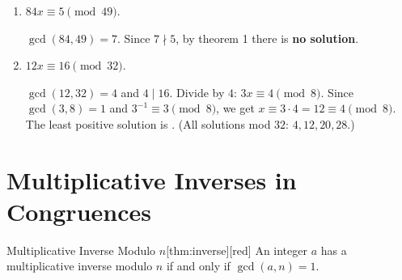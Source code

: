 \documentclass[11pt]{article}
\begin{document}
\begin{enumerate}
  \item $84x\equiv5\pmod{49}$.
  \begin{subanswer}
    $\gcd(84,49)=7$. Since $7\nmid5$, by theorem 1 there is \textbf{no solution}.
  \end{subanswer}
  \item $12x\equiv16\pmod{32}$.
  \begin{subanswer}
    $\gcd(12,32)=4$ and $4\mid16$. Divide by $4$: $3x\equiv4\pmod8$. Since $\gcd(3,8)=1$ and $3^{-1}\equiv3\pmod8$, we get $x\equiv3\cdot4=12\equiv4\pmod8$. The least positive solution is . (All solutions mod $32$: $4,12,20,28$.)
  \end{subanswer}
\end{enumerate}






\newpage

\section*{Multiplicative Inverses in Congruences}

\begin{define}{Multiplicative Inverse Modulo $n$}[thm:inverse][red]
  An integer $a$ has a multiplicative inverse modulo $n$ if and only if $\gcd(a,n)=1$.
\end{define}
\end{document}
